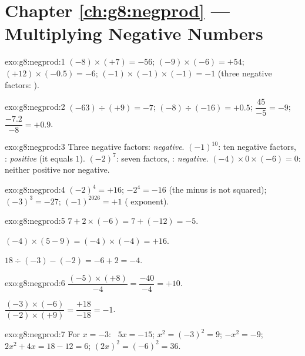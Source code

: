 \section*{Chapter \ref{ch:g8:negprod} --- Multiplying Negative Numbers}

\begin{solution}{exo:g8:negprod:1}
$(-8) \times (+7) = -56$; \quad
$(-9) \times (-6) = +54$; \quad
$(+12) \times (-0.5) = -6$; \quad
$(-1) \times (-1) \times (-1) = -1$ (three negative factors: ).
\end{solution}

\begin{solution}{exo:g8:negprod:2}
$(-63) \div (+9) = -7$; \quad
$(-8) \div (-16) = +0.5$; \quad
$\dfrac{45}{-5} = -9$; \quad
$\dfrac{-7.2}{-8} = +0.9$.
\end{solution}

\begin{solution}{exo:g8:negprod:3}
Three negative factors: \emph{negative}. \quad
$(-1)^{10}$: ten negative factors, : \emph{positive} (it equals
$1$). \quad
$(-2)^7$: seven factors, : \emph{negative}. \quad
$(-4) \times 0 \times (-6) = 0$: neither positive nor negative.
\end{solution}

\begin{solution}{exo:g8:negprod:4}
$(-2)^4 = +16$; \quad $-2^4 = -16$ (the minus is not squared); \quad
$(-3)^3 = -27$; \quad $(-1)^{2026} = +1$ ( exponent).
\end{solution}

\begin{solution}{exo:g8:negprod:5}
$7 + 2 \times (-6) = 7 + (-12) = -5$.

$(-4) \times (5 - 9) = (-4) \times (-4) = +16$.

$18 \div (-3) - (-2) = -6 + 2 = -4$.
\end{solution}

\begin{solution}{exo:g8:negprod:6}
$\dfrac{(-5) \times (+8)}{-4} = \dfrac{-40}{-4} = +10$.

$\dfrac{(-3) \times (-6)}{(-2) \times (+9)} = \dfrac{+18}{-18} = -1$.
\end{solution}

\begin{solution}{exo:g8:negprod:7}
For $x = -3$: \ $5x = -15$; \quad $x^2 = (-3)^2 = 9$; \quad
$-x^2 = -9$; \quad $2x^2 + 4x = 18 - 12 = 6$; \quad
$(2x)^2 = (-6)^2 = 36$.
\end{solution}

